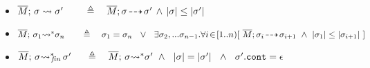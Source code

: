\begin{definition} 
\label{def:shallow:term}
$ ~ $ %

\begin{itemize}

 
  \item
{  $\overline{M};\, {\sigma} \rightsquigarrow \sigma' \ \ \   \,   \ \ \ \triangleq \ \ \  \overline{M};\sigma\! \dashrightarrow\! {\sigma'} \, \wedge\, 
 |\sigma| \leq |\sigma'| $}
  \item
{  $\leadstoBoundedStar {\Mtwo}  {\sigma_1}  {\sigma_n}  \ \ \,  \ \    \ \triangleq  \ \ \  {\sigma_1} = {\sigma_n}\ \ \vee \ \  \exists \sigma_2,...\sigma_{n-1}.\forall i\!\in\! [1..n)[\  \leadstoOrig {\Mtwo}  {\sigma_i}  {\sigma_{i+1}}\  \wedge\  \EarlierS{\sigma_1} {\sigma_{i+1}} \ ]$ }
\item
  $\leadstoBoundedStarFin {\Mtwo}  {\sigma}  {\sigma'}  \  \,  \ \  \ \triangleq  \ \ \  \leadstoBoundedStar {\Mtwo}  {\sigma}  {\sigma'}  \ \wedge\ \
 {\DepthFs \sigma = \DepthFs {\sigma'} \ \ \wedge \ \ \sigma'.\prg{cont}=\epsilon  } $
 \end{itemize}
\end{definition}


